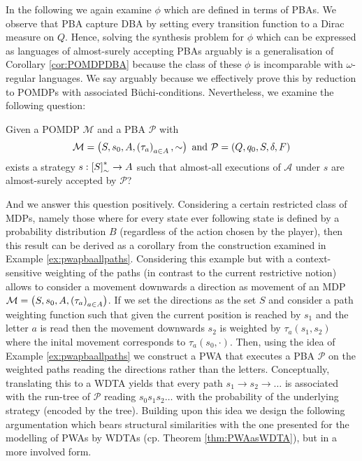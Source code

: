 In the following we again examine $\phi$ which are defined in terms of 
\acp{PBA}. We observe that \ac{PBA} capture \ac{DBA} by setting every 
transition function to a Dirac measure on $Q$. Hence, solving the synthesis 
problem for $\phi$ which can be expressed as languages of almost-surely 
accepting \acp{PBA} arguably is a generalisation of Corollary 
\ref{cor:POMDPDBA} because the class of these $\phi$ is incomparable with 
$\omega$-regular languages. We say arguably because we effectively prove this
by reduction to \acp{POMDP} with associated Büchi-conditions. Nevertheless, we 
examine the following question:
\begin{definition}
  Given a \ac{POMDP} $\mathcal{M}$ and a \ac{PBA} $\mathcal{P}$ with
  \begin{equation*}
    \mathcal{M} = \left(S, s_{0}, A, \left(\tau_{a}\right)_{a\in A}, \sim\right)
  \text{ and }
    \mathcal{P} = \left(Q, q_{0}, S, \delta, F\right)
  \end{equation*}
  exists a strategy $s:\left[S\right]_{\sim}^{*}\rightarrow A$ such that 
  almost-all executions of $\mathcal{A}$ under $s$ are almost-surely accepted 
  by $\mathcal{P}$?
  \label{def:pbastratsynthesis}
\end{definition}
And we answer this question positively. Considering a certain restricted class 
of \acp{MDP}, namely those where for every state ever following state is 
defined by a probability distribution $B$ (regardless of the action chosen by 
the player), then this result can be derived as a corollary from the 
construction examined in Example \ref{ex:pwapbaallpaths}. Considering this 
example but with a context-sensitive weighting of the paths (in contrast to 
the current restrictive notion) allows to consider a movement downwards a 
direction as movement of an \ac{MDP} $\mathcal{M} = \left(S, s_{0}, A, 
\left(\tau_{a}\right)_{a\in A}\right)$. If we set the directions as the set $S$ and 
consider a path weighting function such that given the current position is 
reached by $s_{1}$ and the letter $a$ is read then the movement downwards 
$s_{2}$ is weighted by $\tau_{a}(s_{1}, s_{2})$ where the inital movement 
corresponds to $\tau_{a}(s_{0}, \cdot)$. Then, using the idea of Example 
\ref{ex:pwapbaallpaths} we construct a \ac{PWA} that executes a \ac{PBA} 
$\mathcal{P}$ on the weighted paths reading the directions rather than the 
letters. Conceptually, translating this to a \ac{WDTA} yields that every path 
$s_{1}\rightarrow s_{2}\rightarrow\dots$ is associated with the run-tree of 
$\mathcal{P}$ reading $s_{0}s_{1}s_{2}\dots$ with the probability of the 
underlying strategy (encoded by the tree). Building upon this idea we design 
the following argumentation which bears structural similarities with the one 
presented for the modelling of \acp{PWA} by \acp{WDTA} (cp. Theorem 
\ref{thm:PWAasWDTA}), but in a more involved form.

